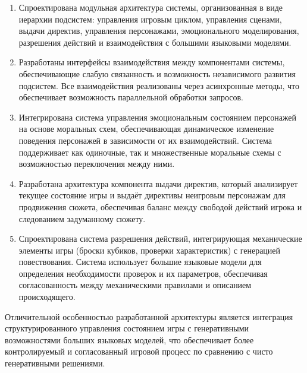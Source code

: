 \begin{enumerate}
	\item Спроектирована модульная архитектура системы, организованная в виде иерархии подсистем: управления игровым циклом, управления сценами, выдачи директив, управления персонажами, эмоционального моделирования, разрешения действий и взаимодействия с большими языковыми моделями.
	
	\item Разработаны интерфейсы взаимодействия между компонентами системы, обеспечивающие слабую связанность и возможность независимого развития подсистем. Все взаимодействия реализованы через асинхронные методы, что обеспечивает возможность параллельной обработки запросов.
	
	\item Интегрирована система управления эмоциональным состоянием персонажей на основе моральных схем, обеспечивающая динамическое изменение поведения персонажей в зависимости от их взаимодействий. Система поддерживает как одиночные, так и множественные моральные схемы с возможностью переключения между ними.
	
	\item Разработана архитектура компонента выдачи директив, который анализирует текущее состояние игры и выдаёт директивы неигровым персонажам для продвижения сюжета, обеспечивая баланс между свободой действий игрока и следованием задуманному сюжету.
	
	\item Спроектирована система разрешения действий, интегрирующая механические элементы игры (броски кубиков, проверки характеристик) с генерацией повествования. Система использует большие языковые модели для определения необходимости проверок и их параметров, обеспечивая согласованность между механическими правилами и описанием происходящего.
\end{enumerate}

Отличительной особенностью разработанной архитектуры является интеграция структурированного управления состоянием игры с генеративными возможностями больших языковых моделей, что обеспечивает более контролируемый и согласованный игровой процесс по сравнению с чисто генеративными решениями.

